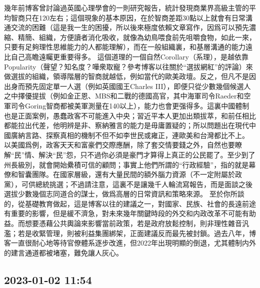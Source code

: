\documentclass[twocolumn]{ctexart}
\begin{document}
幾年前博客曾討論過英國心理學會的一則研究報告，統計發現商業界高級主管的平均智商只在120左右；這個現象的基本原因，在於智商差距30點以上就會有日常溝通交流的困難（這是我一生的困擾，所以後來極度依賴文章寫作，因爲可以預先濃縮、精簡、組織，方便讀者消化吸收，就像為幼鳥喂食前先咀嚼食物，如此一來，只要有足夠理性思維能力的人都能理解），而在一般組織裏，和基層溝通的能力遠比自己高瞻遠矚更重要得多。
這個道理的一個自然Corollary（系理），是越依靠Popularity（聲望？知名度？嘩衆取寵？參考博客以往關於“選拔網紅”的評論）來做選拔的組織，領導階層的智商就越低，例如當代的歐美政壇。反之，但凡不是因出身而預先固定單一人選（例如英國國王Charles III），即便只從少數幾個候選人之中擇優提拔（例如金正恩、MBS和二戰的德國高官，其中海軍司令Raeder和空軍司令Goring智商都被美軍測量在140以上），能力也會更强得多。這裏中國體制也是正面案例，愚蠢政客不可能進入中央；習近平本人更加出類拔萃，和前任相比都能拉出代差，他明辨是非、察納雅言的能力是毋庸置疑的；所以問題出在現代中國廣納言路、探察真相的機制不但不如李世民或雍正，連歐美和台灣都比不上。
以美國爲例，政客天天和富豪們交際應酬，除了套交情要錢之外，自然也要瞭解“民”情、解決“民”怨，只不過你必須是豪門才算得上真正的公民罷了。至少到了州長級別，就會開始纍積可信的顧問；事實上他們所謂的“行政經驗”，指的就是幕僚和智囊團隊。在國家層級，還有大量民間的額外腦力資源（不一定附屬於政黨），可供總統挑選；不過請注意，這裏不是讓幾千人輪流寫報告，而是面談之後選拔少數幾個志同道合的謀士，做爲高層的日常資訊和策略來源。
至於你所談的，從基礎教育做起，這是博客以往的建議之一，對國家、民族、社會的長遠前途有重要的影響，但是緩不濟急，對未來幾年關鍵時段的外交和内政改革不可能有助益。而想要憑藉公共輿論來影響當前政策，若是政府放鬆控制，則非理性雜音汎濫；若是收緊管理，則被利益集團綁架，正面建議反而最先被封鎖。過去八年，博客一直很耐心地等待官僚體系逐步改進，但2022年出現明顯的倒退，尤其體制内外的建言通道都被堵塞，難免讓人灰心。
\subsection*{2023-01-02 11:54}
\end{document}

